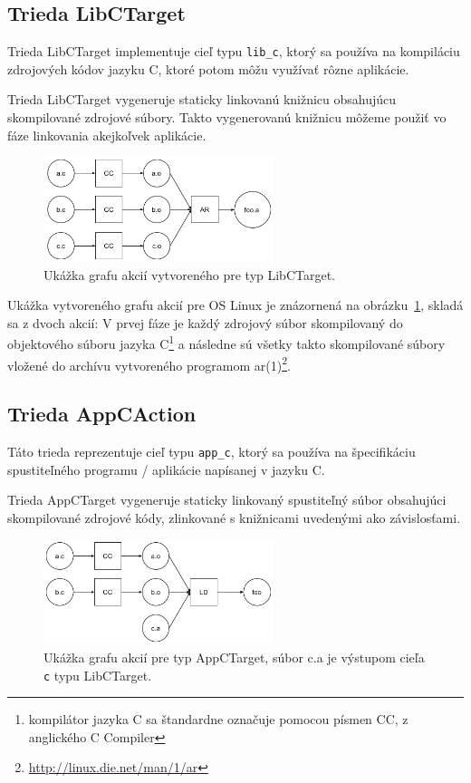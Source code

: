 \subsection{Trieda LibCTarget}
\label{sec:master:libctarget}

Trieda LibCTarget implementuje cieľ typu \verb!lib_c!, ktorý sa používa na
kompiláciu zdrojových kódov jazyku C, ktoré potom môžu využívať rôzne aplikácie.

Trieda LibCTarget vygeneruje staticky linkovanú knižnicu obsahujúcu skompilované
zdrojové súbory. Takto vygenerovanú knižnicu môžeme použiť vo fáze linkovania
akejkoľvek aplikácie.

\begin{figure}[h]
  \centerline{\includegraphics[width=0.6\textwidth]{images/libctarget}}
  \caption[Graf akcií pre typ LibCTarget]{Ukážka grafu akcií vytvoreného pre typ
  LibCTarget.}
  \label{img:libctarget}
\end{figure}


Ukážka vytvoreného grafu akcií pre OS Linux je znázornená na obrázku~\ref{img:libctarget},
skladá sa z dvoch akcií: V prvej fáze je každý zdrojový súbor skompilovaný
do objektového súboru jazyka C\footnote{kompilátor jazyka C sa štandardne označuje
pomocou písmen CC, z anglického C Compiler} a následne sú všetky takto skompilované súbory
vložené do archívu vytvoreného programom ar(1)\footnote{\url{http://linux.die.net/man/1/ar}}.

\subsection{Trieda AppCAction}
\label{sec:master:appcaction}

Táto trieda reprezentuje cieľ typu \verb!app_c!, ktorý sa používa na špecifikáciu
spustiteľného programu / aplikácie napísanej v jazyku C.

Trieda AppCTarget vygeneruje staticky linkovaný spustiteľný súbor obsahujúci
skompilované zdrojové kódy, zlinkované s knižnicami uvedenými ako závislosťami.

\begin{figure}[h]
  \centerline{\includegraphics[width=0.6\textwidth]{images/appctarget}}
  \caption[Graf akcií pre typ AppCTarget]{Ukážka grafu akcií pre typ AppCTarget,
  súbor c.a je výstupom cieľa \texttt{c} typu LibCTarget.}
  \label{img:appctarget}
\end{figure}


